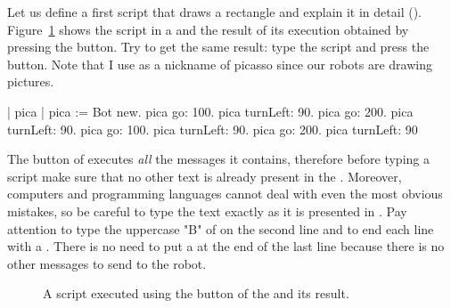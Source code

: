 Let us define a first script  that draws a rectangle and explain it in detail ().  Figure~\ref{fig:doit} shows the script in a \tw and the result of its execution  obtained by pressing the  button. Try to get the same result: type the script and press the  button. Note that I use  as a nickname of picasso since our robots are drawing pictures. 


\begin{scriptwithouttitle}\label{scr:firstScript}
| pica |
pica := Bot new.
pica go: 100.
pica turnLeft: 90.
pica go: 200.
pica turnLeft: 90.
pica go: 100.
pica turnLeft: 90.
pica go: 200.
pica turnLeft: 90
\end{scriptwithouttitle}


The  button of \tw executes \emph{all} the messages it contains, therefore before typing a script make sure that no other text is already present in the \tw.  Moreover, computers and programming languages cannot deal with even the most obvious mistakes, so be careful to type the text exactly as it is presented in . Pay attention to type the   uppercase "B" of  on the second line and to end  each line with  a \period. There is no need to put a \period at the end of the last line because there is no other messages to send to the robot.


\begin{figure}[!h]
\caption{A script executed using the  button of the \tw and its result.\label{fig:doit}}
\end{figure}






